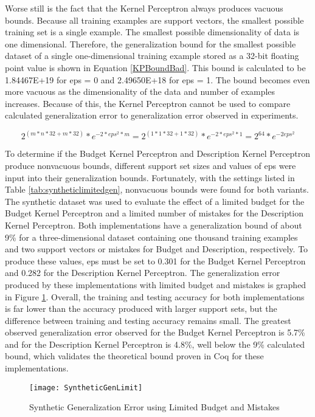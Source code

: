 Worse still is the fact that the Kernel Perceptron always produces vacuous bounds. Because all training examples are support vectors, the smallest possible training set is a single example. The smallest possible dimensionality of data is one dimensional. Therefore, the generalization bound for the smallest possible dataset of a single one-dimensional training example stored as a 32-bit floating point value is shown in Equation \ref{KPBoundBad}. This bound is calculated to be 1.84467E+19 for eps = 0 and 2.49650E+18 for eps = 1. The bound becomes even more vacuous as the dimensionality of the data and number of examples increases. Because of this, the Kernel Perceptron cannot be used to compare calculated generalization error to generalization error observed in experiments.

\begin{equation} \label{KPBoundBad}
 2^{(m*n*32 + m*32)} * e^{-2*eps^{2}*m} = 2^{(1*1*32 + 1*32)} * e^{-2*eps^{2}*1} = 2^{64}*e^{-2eps^{2}}
\end{equation}

To determine if the Budget Kernel Perceptron and Description Kernel Perceptron produce nonvacuous bounds, different support set sizes and values of eps were input into their generalization bounds. Fortunately, with the settings listed in Table \ref{tab:syntheticlimitedgen}, nonvacuous bounds were found for both variants. The synthetic dataset was used to evaluate the effect of a limited budget for the Budget Kernel Perceptron and a limited number of mistakes for the Description Kernel Perceptron. Both implementations have a generalization bound of about 9\% for a three-dimensional dataset containing one thousand training examples and two support vectors or mistakes for Budget and Description, respectively. To produce these values, eps must be set to 0.301 for the Budget Kernel Perceptron and 0.282 for the Description Kernel Perceptron. The generalization error produced by these implementations with limited budget and mistakes is graphed in Figure \ref{SyntheticGenErr2Fig}. Overall, the training and testing accuracy for both implementations is far lower than the accuracy produced with larger support sets, but the difference between training and testing accuracy remains small. The greatest observed generalization error observed for the Budget Kernel Perceptron is 5.7\% and for the Description Kernel Perceptron is 4.8\%, well below the 9\% calculated bound, which validates the theoretical bound proven in Coq for these implementations.

\begin{figure}[h]\label{SyntheticGenErr2Fig}
 \caption{Synthetic Generalization Error using Limited Budget and Mistakes}
 \texttt{[image: SyntheticGenLimit]}
\end{figure}

